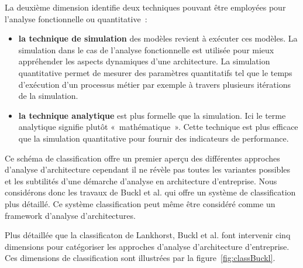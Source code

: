 La deuxième dimension identifie deux techniques pouvant être employées pour 
l'analyse fonctionnelle ou quantitative~:
	\begin{itemize}
		\item \textbf{la technique de simulation} des modèles revient à exécuter ces 
modèles. La simulation dans le cas de l'analyse fonctionnelle est utilisée pour 
mieux appréhender les aspects dynamiques d'une architecture. La simulation 
quantitative permet de mesurer des paramètres quantitatifs tel que le temps 
d'exécution d'un processus métier par exemple à travers plusieurs itérations de 
la simulation. 
		\item \textbf{la technique analytique} est plus formelle que la simulation. 
Ici le terme analytique signifie plutôt «~mathématique~». Cette technique est 
plus efficace que la simulation quantitative pour fournir des indicateurs de 
performance. 
	\end{itemize}
	
Ce schéma de classification offre un premier aperçu des différentes approches 
d'analyse d'architecture cependant il ne révèle pas toutes les variantes 
possibles et les subtilités d'une démarche d'analyse en architecture 
d'entreprise. Nous considérons donc les travaux de Buckl et al. qui offre un 
système de classification plus détaillé. Ce système classification peut même 
être considéré comme un framework d'analyse d'architectures.

Plus détaillée que la classificaton de Lankhorst, Buckl et al. 
\cite{buckl2009classifying} font intervenir cinq dimensions pour catégoriser les 
approches d'analyse d'architecture d'entreprise. Ces dimensions de 
classification sont illustrées par la figure~\ref{fig:classBuckl}.



